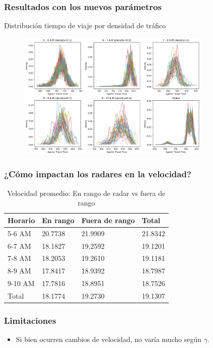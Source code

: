 \documentclass[10pt, compress]{beamer}
\begin{document}
\begin{frame}[fragile]
\frametitle{Resultados con los nuevos par\'ametros}

\centering
Distribuci\'on tiempo de viaje por densidad de tr\'afico

\begin{figure}
\centering
\includegraphics[width=25em]{images/travel_time_global.png}
\end{figure}


\end{frame}

\begin{frame}[fragile]
\frametitle{¿C\'omo impactan los radares en la velocidad?}
  \begin{table}
    \caption{Velocidad promedio: En rango de radar vs fuera de rango}
    \begin{tabular}{llll}
      \toprule
      Horario & En rango & Fuera de rango & Total \\
      \midrule
      5-6 AM & 20.7738 & 21.9909 & 21.8342\\
      6-7 AM & 18.1827 & 19.2592 & 19.1201\\
      7-8 AM & 18.2053 & 19.2610 & 19.1181\\
      8-9 AM & 17.8417 & 18.9392 & 18.7987\\
      9-10 AM & 17.7816 & 18.8951 & 18.7526\\
      Total & 18.1774 & 19.2730 & 19.1307\\
      \bottomrule
    \end{tabular}
  \end{table}
\end{frame}

\begin{frame}[fragile]
\frametitle{Limitaciones}

\begin{itemize}
\item Si bien ocurren cambios de velocidad, no var\'ia mucho seg\'un $\gamma$. 
\end{itemize}

\end{frame}
\end{document}
